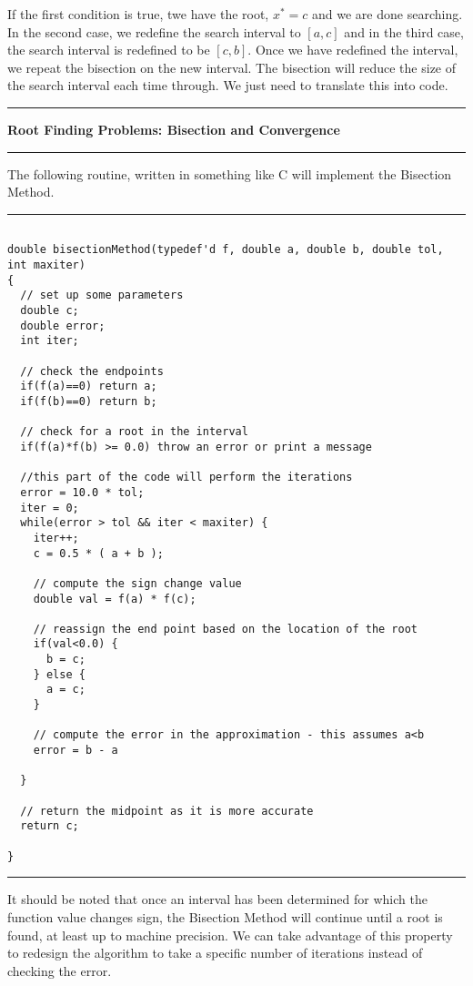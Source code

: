 \documentclass[10pt,fleqn]{article}
\begin{document}
If the first condition is true, twe have the root, $x^*=c$ and we are done
searching. In the second case, we redefine the search interval to $[a,c]$ and
in the third case, the search interval is redefined to be $[c,b]$. Once we have
redefined the interval, we repeat the bisection on the new interval. The
bisection will reduce the size of the search interval each time through. We just
need to translate this into code.
\vskip0.1in\hrule\vskip0.1in
\noindent
{\bf Root Finding Problems: Bisection and Convergence}
\vskip0.1in\hrule\vskip0.1in
\noindent
The following routine, written in something like C will implement the Bisection
Method.
\vskip0.1in\hrule\vskip0.1in
\begin{verbatim}

double bisectionMethod(typedef'd f, double a, double b, double tol, int maxiter)
{
  // set up some parameters
  double c;
  double error;
  int iter;
 
  // check the endpoints
  if(f(a)==0) return a;
  if(f(b)==0) return b;

  // check for a root in the interval
  if(f(a)*f(b) >= 0.0) throw an error or print a message

  //this part of the code will perform the iterations
  error = 10.0 * tol;
  iter = 0;
  while(error > tol && iter < maxiter) {
    iter++;
    c = 0.5 * ( a + b );

    // compute the sign change value
    double val = f(a) * f(c);

    // reassign the end point based on the location of the root
    if(val<0.0) {
      b = c;
    } else {
      a = c;
    }

    // compute the error in the approximation - this assumes a<b
    error = b - a

  }
  
  // return the midpoint as it is more accurate
  return c;
  
}

\end{verbatim}
\vskip0.1in\hrule\vskip0.1in
\noindent
It should be noted that once an interval has been determined for which the
function value changes sign, the Bisection Method will continue until a root is
found, at least up to machine precision. We can take advantage of this property
to redesign the algorithm to take a specific number of iterations instead of
checking the error.
\end{document}
